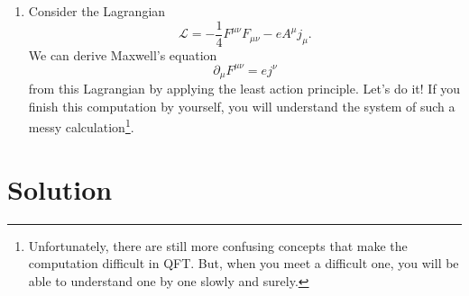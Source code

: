 \documentclass[a4paper,pdftex]{article}
\begin{document}
\begin{enumerate}
   \item 
   Consider the Lagrangian
   \begin{equation}
      \mathcal{L}
      =
      -
      \frac{1}{4}
      F^{\mu\nu}F_{\mu\nu}
      -
      eA^{\mu}j_{\mu}
      .
   \end{equation}
   We can derive Maxwell's equation
   \begin{equation}
      \partial_{\mu}F^{\mu\nu}
      =
      ej^{\nu}
   \end{equation}
   from this Lagrangian by applying the least action principle. Let's do it! If you finish this computation by yourself, you will understand the system of such a messy calculation\footnote{
      Unfortunately, there are still more confusing concepts that make the computation difficult in QFT. But, when you meet a difficult one, you will be able to understand one by one slowly and surely.
   }.

\end{enumerate}


\section{Solution}
\end{document}

